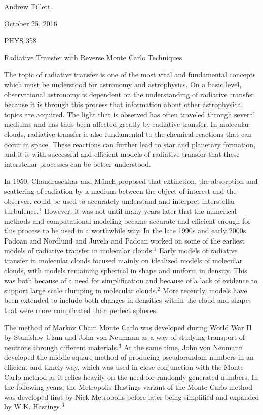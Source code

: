 \documentclass[a4paper, 10pt]{article}
\title{}
\author{Andrew Tillett}
\begin{document}
\noindent Andrew Tillett

\noindent October 25, 2016

\noindent PHYS 358

\begin{center}
Radiative Transfer with Reverse Monte Carlo Techniques
\end{center}

The topic of radiative transfer is one of the most vital and fundamental concepts which must be understood for astronomy and astrophysics. On a basic level, observational astronomy is dependent on the understanding of radiative transfer because it is through this process that information about other astrophysical topics are acquired. The light that is observed has often traveled through several mediums and has thus been affected greatly by radiative transfer. In molecular clouds, radiative transfer is also fundamental to the chemical reactions that can occur in space. These reactions can further lead to star and planetary formation, and it is with successful and efficient models of radiative transfer that these interstellar processes can be better understood.  

	In 1950, Chandrasekhar and Münch proposed that extinction, the absorption and scattering of radiation by a medium between the object of interest and the observer, could be used to accurately understand and interpret interstellar turbulence.$^1$ However, it was not until many years later that the numerical methods and computational modeling became accurate and efficient enough for this process to be used in a worthwhile way. In the late 1990s and early 2000s Padoan and Nordlund and Juvela and Padoan worked on some of the earliest models of radiative transfer in molecular clouds.$^1$ Early models of radiative transfer in molecular clouds focused mainly on idealized models of molecular clouds, with models remaining spherical in shape and uniform in density. This was both because of a need for simplification and because of a lack of evidence to support large scale clumping in molecular clouds.$^2$ More recently, models have been extended to include both changes in densities within the cloud and shapes that were more complicated than perfect spheres. 
    
	The method of Markov Chain Monte Carlo was developed during World War II by Stanislaw Ulam and John von Neumann as a way of studying transport of neutrons through different materials.$^3$ At the same time, John von Neumann developed the middle-square method of producing pseudorandom numbers in an efficient and timely way, which was used in close conjunction with the Monte Carlo method as it relies heavily on the need for randomly generated numbers. In the following years, the Metropolis-Hastings variant of the Monte Carlo method was developed first by Nick Metropolis before later being simplified and expanded by W.K. Hastings.$^3$ 
\end{document}
